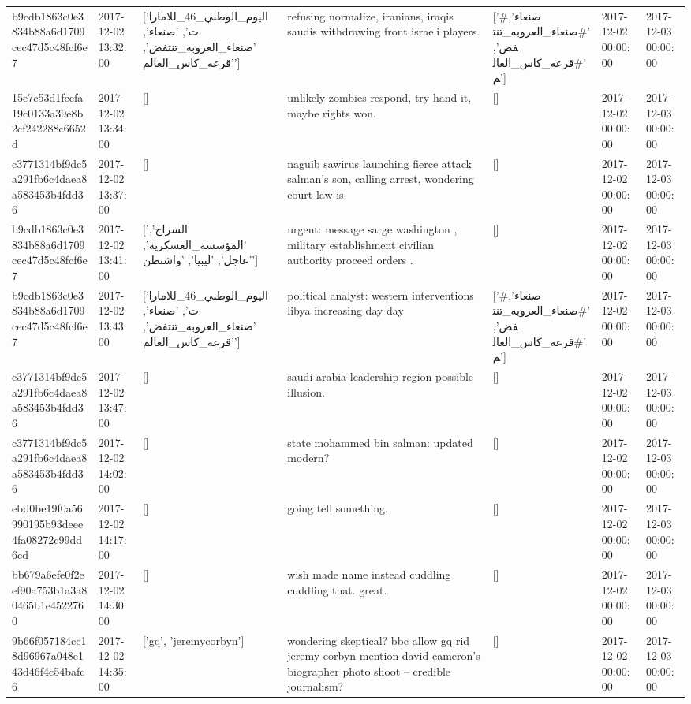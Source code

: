 \begin{tabular}{lllllll}
b9cdb1863c0e3834b88a6d1709cec47d5c48fcf6e7 & 2017-12-02 13:32:00 & ['اليوم_الوطني_46_للامارات', 'صنعاء', 'صنعاء_العروبه_تنتفض', 'قرعه_كاس_العالم'] & refusing normalize, iranians, iraqis saudis withdrawing front israeli players. & ['#صنعاء', '#صنعاء_العروبه_تنتفض', '#قرعه_كاس_العالم'] & 2017-12-02 00:00:00 & 2017-12-03 00:00:00 \\
15e7c53d1fccfa19c0133a39e8b2cf242288c6652d & 2017-12-02 13:34:00 & [] & unlikely zombies respond, try hand it, maybe rights won. & [] & 2017-12-02 00:00:00 & 2017-12-03 00:00:00 \\
c3771314bf9dc5a291fb6c4daea8a583453b4fdd36 & 2017-12-02 13:37:00 & [] & naguib sawirus launching fierce attack salman's son, calling arrest, wondering court law is. & [] & 2017-12-02 00:00:00 & 2017-12-03 00:00:00 \\
b9cdb1863c0e3834b88a6d1709cec47d5c48fcf6e7 & 2017-12-02 13:41:00 & ['السراج', 'المؤسسة_العسكرية', 'عاجل', 'ليبيا', 'واشنطن'] & urgent: message sarge washington , military establishment civilian authority proceed orders . & [] & 2017-12-02 00:00:00 & 2017-12-03 00:00:00 \\
b9cdb1863c0e3834b88a6d1709cec47d5c48fcf6e7 & 2017-12-02 13:43:00 & ['اليوم_الوطني_46_للامارات', 'صنعاء', 'صنعاء_العروبه_تنتفض', 'قرعه_كاس_العالم'] & political analyst: western interventions libya increasing day day & ['#صنعاء', '#صنعاء_العروبه_تنتفض', '#قرعه_كاس_العالم'] & 2017-12-02 00:00:00 & 2017-12-03 00:00:00 \\
c3771314bf9dc5a291fb6c4daea8a583453b4fdd36 & 2017-12-02 13:47:00 & [] & saudi arabia leadership region possible illusion. & [] & 2017-12-02 00:00:00 & 2017-12-03 00:00:00 \\
c3771314bf9dc5a291fb6c4daea8a583453b4fdd36 & 2017-12-02 14:02:00 & [] & state mohammed bin salman: updated modern? & [] & 2017-12-02 00:00:00 & 2017-12-03 00:00:00 \\
ebd0be19f0a56990195b93deee4fa08272c99dd6cd & 2017-12-02 14:17:00 & [] & going tell something. & [] & 2017-12-02 00:00:00 & 2017-12-03 00:00:00 \\
bb679a6efe0f2eef90a753b1a3a80465b1e4522760 & 2017-12-02 14:30:00 & [] & wish made name instead cuddling cuddling that. great. & [] & 2017-12-02 00:00:00 & 2017-12-03 00:00:00 \\
9b66f057184cc18d96967a048e143d46f4c54bafc6 & 2017-12-02 14:35:00 & ['gq', 'jeremycorbyn'] & wondering skeptical? bbc allow gq rid jeremy corbyn mention david cameron's biographer photo shoot -- credible journalism? & [] & 2017-12-02 00:00:00 & 2017-12-03 00:00:00 \\

\end{tabular}
